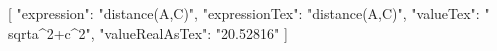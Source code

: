 ﻿[
  {
    "expression": "distance(A,C)",
    "expressionTex": "distance(A,C)",
    "valueTex": "\\sqrt{a^{2}+c^{2}}",
    "valueRealAsTex": "20.52816"
  }
]
